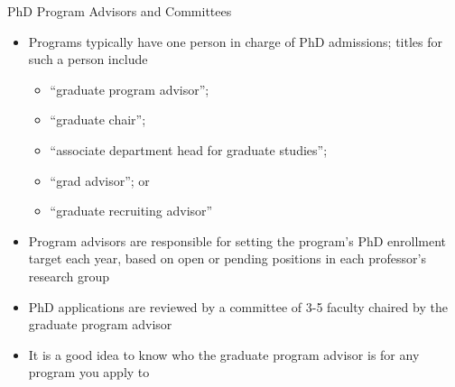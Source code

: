 \begin{frame}[fragile]{PhD Program Advisors and Committees}
\begin{itemize}
    \item Programs typically have one person in charge of PhD admissions; titles for such a person include
    \begin{itemize}
        \item ``graduate program advisor'';
        \item ``graduate chair'';
        \item ``associate department head for graduate studies'';
        \item ``grad advisor''; or
        \item ``graduate recruiting advisor''
    \end{itemize}
    \item Program advisors are responsible for setting the program's PhD enrollment target each year, based on open or pending positions in each professor's research group
    \item PhD applications are reviewed by a committee of 3-5 faculty chaired by the graduate program advisor
    \item It is a good idea to know who the graduate program advisor is for any program you apply to
\end{itemize}
\end{frame}

